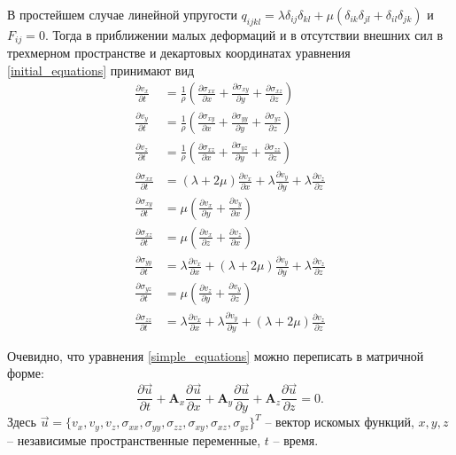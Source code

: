 В простейшем случае линейной упругости $q_{ijkl}=\lambda\delta_{ij}\delta_{kl}+\mu(\delta_{ik}\delta_{jl}+\delta_{il}\delta_{jk})$ и $F_{ij}=0$. Тогда в приближении малых деформаций и в отсутствии внешних сил в трехмерном пространстве и декартовых координатах уравнения \eqref{initial_equations} принимают вид
\begin{align}
\label{simple_equations}
\frac{\partial{v_x}}{\partial{t}}&=\frac{1}{\rho}(\frac{\partial{\sigma_{xx}}}{\partial{x}}+\frac{\partial{\sigma_{xy}}}{\partial{y}}+\frac{\partial{\sigma_{xz}}}{\partial{z}})
\nonumber\\
\frac{\partial{v_y}}{\partial{t}}&=\frac{1}{\rho}(\frac{\partial{\sigma_{xy}}}{\partial{x}}+\frac{\partial{\sigma_{yy}}}{\partial{y}}+\frac{\partial{\sigma_{yz}}}{\partial{z}})
\nonumber\\
\frac{\partial{v_z}}{\partial{t}}&=\frac{1}{\rho}(\frac{\partial{\sigma_{xz}}}{\partial{x}}+\frac{\partial{\sigma_{yz}}}{\partial{y}}+\frac{\partial{\sigma_{zz}}}{\partial{z}})
\nonumber\\
\frac{\partial{\sigma_{xx}}}{\partial{t}}&=(\lambda+2\mu)\frac{\partial{v_x}}{\partial{x}}+\lambda\frac{\partial{v_y}}{\partial{y}}+\lambda\frac{\partial{v_z}}{\partial{z}}
\nonumber\\
\frac{\partial{\sigma_{xy}}}{\partial{t}}&=\mu(\frac{\partial{v_x}}{\partial{y}}+\frac{\partial{v_y}}{\partial{x}})
\nonumber\\
\frac{\partial{\sigma_{xz}}}{\partial{t}}&=\mu(\frac{\partial{v_x}}{\partial{z}}+\frac{\partial{v_z}}{\partial{x}})
\nonumber\\
\frac{\partial{\sigma_{yy}}}{\partial{t}}&=\lambda\frac{\partial{v_x}}{\partial{x}}+(\lambda+2\mu)\frac{\partial{v_y}}{\partial{y}}+\lambda\frac{\partial{v_z}}{\partial{z}}
\nonumber\\
\frac{\partial{\sigma_{yz}}}{\partial{t}}&=\mu(\frac{\partial{v_z}}{\partial{y}}+\frac{\partial{v_y}}{\partial{z}})
\nonumber\\
\frac{\partial{\sigma_{zz}}}{\partial{t}}&=\lambda\frac{\partial{v_x}}{\partial{x}}+\lambda\frac{\partial{v_y}}{\partial{y}}+(\lambda+2\mu)\frac{\partial{v_z}}{\partial{z}}
\end{align}

Очевидно, что уравнения \eqref{simple_equations} можно переписать в матричной форме:
\begin{equation}
\label{simple_matrix_equation}
\frac{\partial\vec{u}}{\partial{t}}+\mathbf{A}_x\frac{\partial\vec{u}}{\partial{x}}+
\mathbf{A}_y\frac{\partial\vec{u}}{\partial{y}}+
\mathbf{A}_z\frac{\partial\vec{u}}{\partial{z}}=0.
\end{equation}
Здесь
$\vec{u}=\{v_x,v_y,v_z,\sigma_{xx},\sigma_{yy},\sigma_{zz},\sigma_{xy},\sigma_{xz},\sigma_{yz}\}^T$
-- вектор искомых функций, $x,y,z$ --  независимые пространственные переменные, $t$ -- время.

